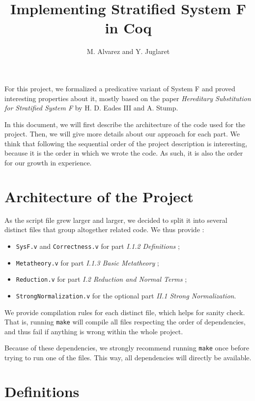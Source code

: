 \documentclass[a4paper,11pt]{article}
\begin{document}
\title{Implementing Stratified System F in Coq}
\author{M. Alvarez and Y. Juglaret}
\date{}
\maketitle

For this project, we formalized a predicative variant of System F and
proved interesting properties about it, mostly based on the paper
\emph{Hereditary Substitution for Stratified System F} by H. D. Eades
III and A. Stump.

In this document, we will first describe the architecture of the code
used for the project. Then, we will give more details about our
approach for each part. We think that following the sequential order
of the project description is interesting, because it is the order in
which we wrote the code. As such, it is also the order for our growth
in experience.

\section{Architecture of the Project}

As the script file grew larger and larger, we decided to split it into
several distinct files that group altogether related code. We thus
provide :

\begin{itemize}
  \item \verb|SysF.v| and \verb|Correctness.v| for part \emph{I.1.2
    Definitions} ;
  \item \verb|Metatheory.v| for part \emph{I.1.3 Basic Metatheory} ;
  \item \verb|Reduction.v| for part \emph{I.2 Reduction and Normal
    Terms} ;
  \item \verb|StrongNormalization.v| for the optional
    part \emph{II.1 Strong Normalization}.
\end{itemize}

We provide compilation rules for each distinct file, which helps
for sanity check. That is, running \verb|make| will compile all files
respecting the order of dependencies, and thus fail if anything is
wrong within the whole project.

Because of these dependencies, we strongly recommend running
\verb|make| once before trying to run one of the files. This way, all
dependencies will directly be available.

\section{Definitions}
\end{document}
